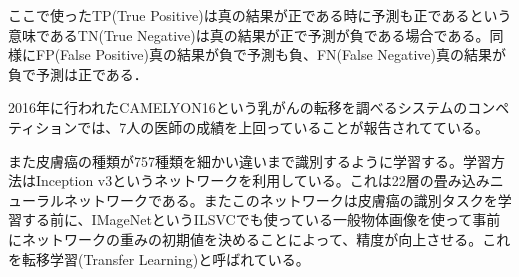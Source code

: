 ここで使ったTP(True Positive)は真の結果が正である時に予測も正であるという意味であるTN(True Negative)は真の結果が正で予測が負である場合である。同様にFP(False Positive)真の結果が負で予測も負、FN(False Negative)真の結果が負で予測は正である．

2016年に行われたCAMELYON16という乳がんの転移を調べるシステムのコンペティションでは、7人の医師の成績を上回っていることが報告されてている。

また皮膚癌の種類が757種類を細かい違いまで識別するように学習する。学習方法はInception v3というネットワークを利用している。これは22層の畳み込みニューラルネットワークである。またこのネットワークは皮膚癌の識別タスクを学習する前に、IMageNetというILSVCでも使っている一般物体画像を使って事前にネットワークの重みの初期値を決めることによって、精度が向上させる。これを転移学習(Transfer Learning)と呼ばれている。
